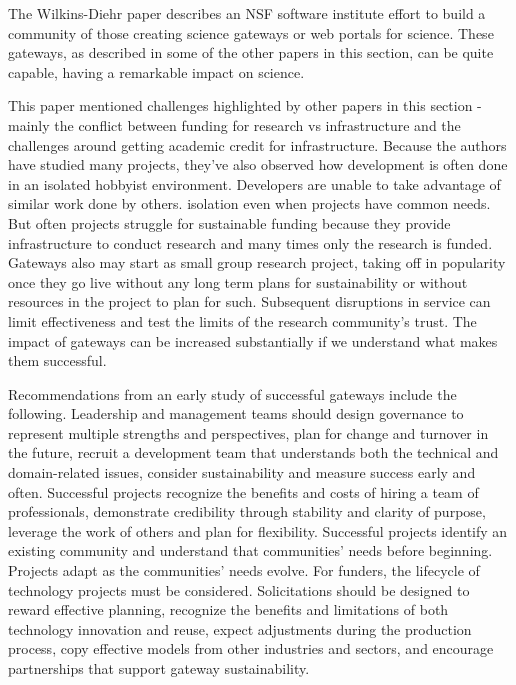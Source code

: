 \documentclass[11pt, oneside]{amsart}
\begin{document}
The Wilkins-Diehr paper describes an NSF software institute effort to build a community of those creating science gateways or
web portals for science. These gateways, as described in some of the other papers in this section, can be quite capable, having a 
remarkable impact on science. 

This paper mentioned challenges highlighted by other papers in this section - mainly the conflict between funding for research
vs infrastructure and the challenges around getting academic credit for infrastructure. Because the authors have studied
many projects, they've also observed how development is often done in an isolated hobbyist environment. Developers are unable
to take advantage of similar work done by others. isolation even when projects have common needs.
But often projects struggle for sustainable funding because they provide infrastructure to conduct
research and many times only the research is funded. Gateways also may start as small group research project, taking off in popularity
once they go live without any long term plans for sustainability or without resources in the project to plan for such.
Subsequent disruptions in service can limit effectiveness and test the limits of the research community's trust. The impact
of gateways can be increased substantially if we understand what makes them successful.

Recommendations from an early study of successful gateways include the following. Leadership and management teams should 
design governance to represent multiple strengths and perspectives, plan for change and turnover in the future, 
recruit a development team that understands both the technical and domain-related issues, consider sustainability and measure success early and often.
Successful projects recognize the benefits and costs of hiring a team of professionals, demonstrate credibility through stability and 
clarity of purpose, leverage the work of others and plan for flexibility.
Successful projects identify an existing community and understand that communities' needs before beginning. Projects adapt
as the communities' needs evolve. For funders, the lifecycle of technology projects must be considered. Solicitations should
be designed to reward effective planning, recognize the benefits and limitations of both technology innovation and reuse,
expect adjustments during the production process, copy effective models from other industries and sectors, and encourage partnerships that support gateway sustainability.
\end{document}
